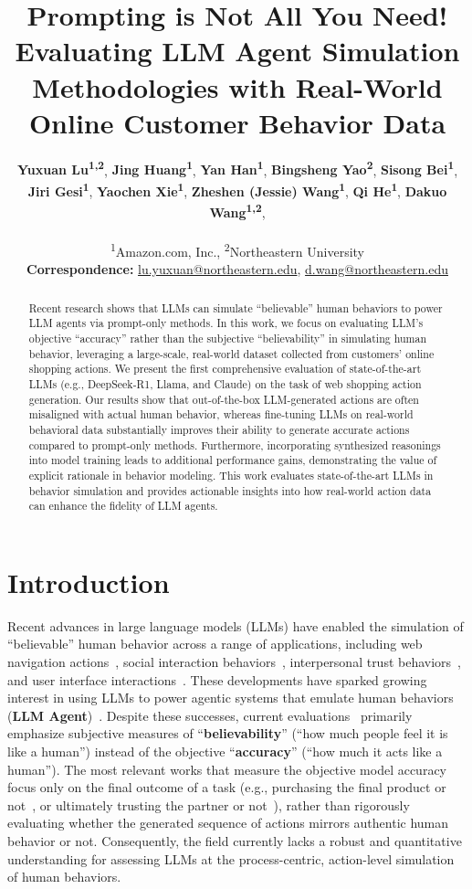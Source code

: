 \documentclass[11pt]{article}
\title{ Prompting is Not All You Need! Evaluating LLM Agent Simulation Methodologies with Real-World Online Customer Behavior Data}
\author{
  \textbf{Yuxuan Lu\textsuperscript{1,2}},
  \textbf{Jing Huang\textsuperscript{1}},
  \textbf{Yan Han\textsuperscript{1}},
  \textbf{Bingsheng Yao\textsuperscript{2}},
  \textbf{Sisong Bei\textsuperscript{1}},
\\
  \textbf{Jiri Gesi\textsuperscript{1}},
  \textbf{Yaochen Xie\textsuperscript{1}},
  \textbf{Zheshen (Jessie) Wang\textsuperscript{1}},
  \textbf{Qi He\textsuperscript{1}},
  \textbf{Dakuo Wang\textsuperscript{1,2}},
\\
\\
  \textsuperscript{1}Amazon.com, Inc.,
  \textsuperscript{2}Northeastern University
\\
  \small{
    \textbf{Correspondence:} \href{mailto:lu.yuxuan@northeastern.edu}{lu.yuxuan@northeastern.edu},
    \href{mailto:d.wang@northeastern.edu}{d.wang@northeastern.edu}
  }
}
\begin{document}
\maketitle
\begin{abstract}
Recent research shows that LLMs can simulate ``believable'' human behaviors to power LLM agents via prompt-only methods. 
In this work, we focus on evaluating LLM's objective ``accuracy'' rather than the subjective ``believability'' in simulating human behavior, leveraging a large-scale, real-world dataset collected from customers' online shopping actions. 
We present the first comprehensive evaluation of state-of-the-art LLMs (e.g., DeepSeek-R1, Llama, and Claude) on the task of web shopping action generation.
Our results show that out-of-the-box LLM-generated actions are often misaligned with actual human behavior, whereas fine-tuning LLMs on real-world behavioral data substantially improves their ability to generate accurate actions compared to prompt-only methods.
Furthermore, incorporating synthesized reasonings into model training leads to additional performance gains, demonstrating the value of explicit rationale in behavior modeling.
This work evaluates state-of-the-art LLMs in behavior simulation and provides actionable insights into how real-world action data can enhance the fidelity of LLM agents.
\end{abstract}

\section{Introduction}

Recent advances in large language models (LLMs) have enabled the simulation of ``believable'' human behavior across a range of applications, including web navigation actions~\cite{gurRealWorldWebAgentPlanning2023, zhouWebArenaRealisticWeb2024}, social interaction behaviors~\cite{parkGenerativeAgentsInteractive2023}, interpersonal trust behaviors~\cite{xieCanLargeLanguage2024}, and user interface interactions~\cite{taebAXNavReplayingAccessibility2024}. 
These developments have sparked growing interest in using LLMs to power agentic systems that emulate human behaviors (\textbf{LLM Agent})~\cite{chenDesignGuidelineRPA2025}. 
Despite these successes, current evaluations~\cite{parkGenerativeAgentsInteractive2023} primarily emphasize subjective measures of ``\textbf{believability}'' (``how much people feel it is like a human'') instead of the objective ``\textbf{accuracy}'' (``how much it acts like a human'').
The most relevant works that measure the objective model accuracy focus only on the final outcome of a task (e.g., purchasing the final product or not~\cite{yaoReActSynergizingReasoning2023},  or ultimately trusting the partner or not~\cite{xieCanLargeLanguage2024}), rather than rigorously evaluating whether the generated sequence of actions mirrors authentic human behavior or not.
Consequently, the field currently lacks a robust and quantitative understanding for assessing LLMs at the process-centric, action-level simulation of human behaviors.
\end{document}

